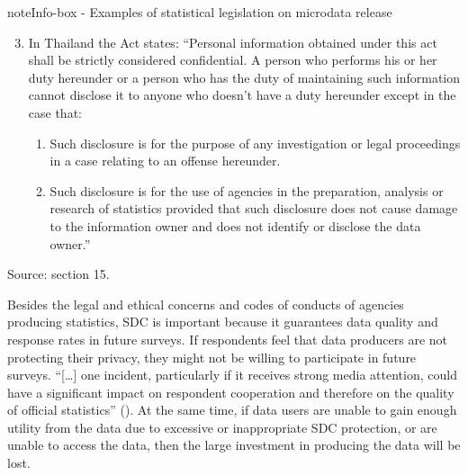 \documentclass[letterpaper,10pt,english]{sphinxmanual}
\begin{document}
\begin{sphinxadmonition}{note}{Info-box - Examples of statistical legislation on microdata release}
\begin{enumerate}
\end{enumerate}
\begin{enumerate}
\setcounter{enumi}{2}
\item {} 
In Thailand the Act states: “Personal information obtained under this act shall be strictly considered confidential. A person who performs his or her duty hereunder or a person who has the duty of maintaining such information cannot disclose it to anyone who doesn’t have a duty hereunder except in the case that:
\begin{enumerate}
\item {} 
Such disclosure is for the purpose of any investigation or legal proceedings in a case relating to an offense hereunder.

\item {} 
Such disclosure is for the use of agencies in the preparation, analysis or research of statistics provided that such disclosure does not cause damage to the information owner and does not identify or disclose the data owner.”

\end{enumerate}

\end{enumerate}

Source:  section 15.
\end{sphinxadmonition}

Besides the legal and ethical concerns and codes of conducts of agencies
producing statistics, SDC is important because it guarantees data
quality and response rates in future surveys. If respondents feel that
data producers are not protecting their privacy, they might not be
willing to participate in future surveys. “{[}…{]} one incident,
particularly if it receives strong media attention, could have a
significant impact on respondent cooperation and therefore on the
quality of official statistics” ({\hyperref[\detokenize{SDC_intro:dubo10}]{}}). At the same time, if data users
are unable to gain enough utility from the data due to excessive or
inappropriate SDC protection, or are unable to access the data, then the
large investment in producing the data will be lost.
\end{document}
